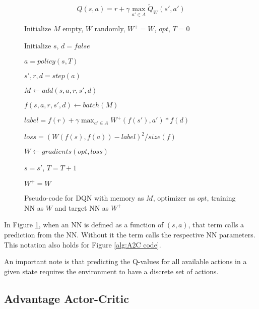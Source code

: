 \documentclass[journal]{IEEEtran}
\begin{document}
		\begin{equation} \label{eq:labelDQN}
			Q(s,a) = r + \gamma \max_{a' \in A} \tilde{Q}_W(s',a')
		\end{equation}
	
		\begin{figure}
			\begin{algorithmic}[h]
			
				\STATE Initialize $M$ empty, $W$ randomly, $W^+ = W$, $opt$, $T=0$
			
			
					\STATE Initialize $s$, $d = false$
				
					
						\STATE $a = policy (s, T)$
						
						\STATE $s', r, d = step (a)$
					
						\STATE $M \leftarrow add(s,a,r,s',d)$
						
						\STATE $f(s,a,r,s',d) \leftarrow batch(M)$
						
						\STATE $label = f(r) + \gamma \max_{a' \in A} W^+(f(s'),a') * f(d)$
						
						\STATE $loss = (W(f(s),f(a)) - label)^2/size(f)$
						
						\STATE $W \leftarrow gradients(opt, loss)$			
						
						\STATE $s = s'$, $T = T+1$
						
					
							\STATE $W^+ = W$
							
						\ENDIF
					\ENDWHILE
				\ENDFOR

			\end{algorithmic}
			\caption{Pseudo-code for DQN with memory as $M$, optimizer as $opt$, training NN as $W$ and target NN as $W^+$}
			\label{alg:DQN code}
		\end{figure}
		
		In Figure \ref{alg:DQN code}, when an NN is defined as a function of $(s,a)$, that term calls a prediction from the NN. Without it the term calls the respective NN parameters. This notation also holds for Figure \ref{alg:A2C code}.
		
		An important note is that predicting the Q-values for all available actions in a given state requires the environment to have a discrete set of actions.

	\subsection{Advantage Actor-Critic}
	
\end{document}
